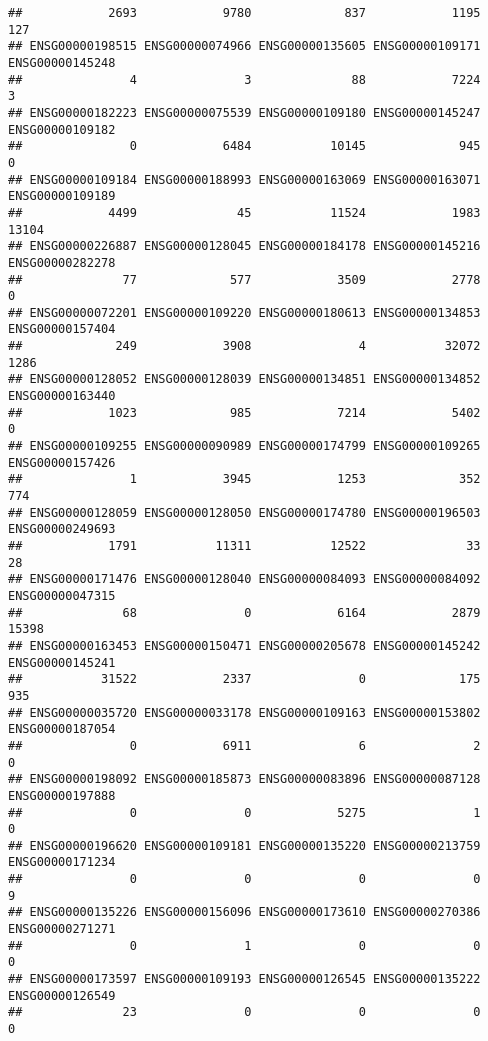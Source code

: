 \documentclass[
]{article}
\begin{document}
\begin{verbatim}
##            2693            9780             837            1195             127 
## ENSG00000198515 ENSG00000074966 ENSG00000135605 ENSG00000109171 ENSG00000145248 
##               4               3              88            7224               3 
## ENSG00000182223 ENSG00000075539 ENSG00000109180 ENSG00000145247 ENSG00000109182 
##               0            6484           10145             945               0 
## ENSG00000109184 ENSG00000188993 ENSG00000163069 ENSG00000163071 ENSG00000109189 
##            4499              45           11524            1983           13104 
## ENSG00000226887 ENSG00000128045 ENSG00000184178 ENSG00000145216 ENSG00000282278 
##              77             577            3509            2778               0 
## ENSG00000072201 ENSG00000109220 ENSG00000180613 ENSG00000134853 ENSG00000157404 
##             249            3908               4           32072            1286 
## ENSG00000128052 ENSG00000128039 ENSG00000134851 ENSG00000134852 ENSG00000163440 
##            1023             985            7214            5402               0 
## ENSG00000109255 ENSG00000090989 ENSG00000174799 ENSG00000109265 ENSG00000157426 
##               1            3945            1253             352             774 
## ENSG00000128059 ENSG00000128050 ENSG00000174780 ENSG00000196503 ENSG00000249693 
##            1791           11311           12522              33              28 
## ENSG00000171476 ENSG00000128040 ENSG00000084093 ENSG00000084092 ENSG00000047315 
##              68               0            6164            2879           15398 
## ENSG00000163453 ENSG00000150471 ENSG00000205678 ENSG00000145242 ENSG00000145241 
##           31522            2337               0             175             935 
## ENSG00000035720 ENSG00000033178 ENSG00000109163 ENSG00000153802 ENSG00000187054 
##               0            6911               6               2               0 
## ENSG00000198092 ENSG00000185873 ENSG00000083896 ENSG00000087128 ENSG00000197888 
##               0               0            5275               1               0 
## ENSG00000196620 ENSG00000109181 ENSG00000135220 ENSG00000213759 ENSG00000171234 
##               0               0               0               0               9 
## ENSG00000135226 ENSG00000156096 ENSG00000173610 ENSG00000270386 ENSG00000271271 
##               0               1               0               0               0 
## ENSG00000173597 ENSG00000109193 ENSG00000126545 ENSG00000135222 ENSG00000126549 
##              23               0               0               0               0 

\end{verbatim}
\end{document}
